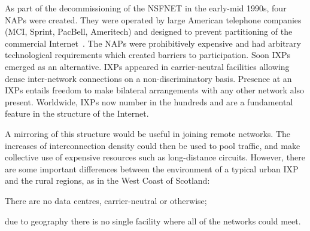 

As part of the decommissioning of the \acs{NSFNET} in the early-mid
1990s, four \acp{NAP} were created. They were operated by large
American telephone companies (MCI, Sprint, PacBell, Ameritech) and
designed to prevent partitioning of the commercial
Internet~\cite{hayes1997computing,Ager:2012}.
The \acp{NAP} were prohibitively expensive and had arbitrary
technological requirements which created barriers to participation.
Soon \acp{IXP} emerged as an alternative. \acp{IXP} appeared in
carrier-neutral facilities allowing dense inter-network connections on
a non-discriminatory basis. Presence at an \acp{IXP} entails freedom
to make bilateral arrangements with any other network also
present. Worldwide, \acp{IXP} now number in the hundreds and are a
fundamental feature in the structure of the Internet.



A mirroring of this structure would be useful in joining remote
networks. The increases of interconnection density could then
be used to pool traffic, and make collective use of expensive resources
such as long-distance circuits. However, there are some important
differences between the environment of a typical urban \ac{IXP} and
the rural regions, as in the West Coast of Scotland:
\begin{inparaenum}[(i)]
  \item There are no data centres, carrier-neutral or otherwise;
  \item due to geography there is no single facility where all of the
    networks could meet.
\end{inparaenum}

